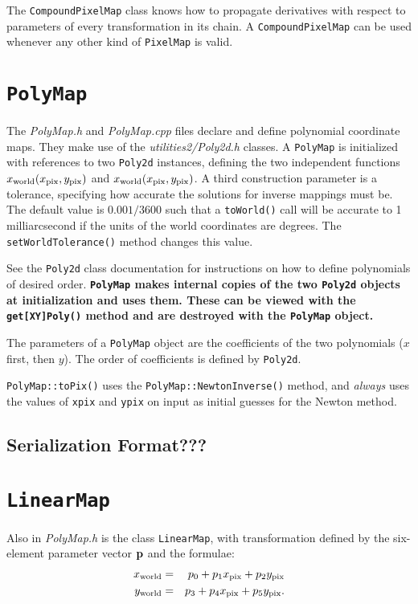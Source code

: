\documentclass[11pt,preprint,flushrt]{aastex}
\begin{document}
The {\tt CompoundPixelMap} class knows how to propagate derivatives with respect to parameters of every transformation in its chain.  A {\tt CompoundPixelMap} can be used whenever any other kind of {\tt PixelMap} is valid.

\section{{\tt PolyMap}}
The {\it PolyMap.h} and {\it PolyMap.cpp} files declare and define polynomial coordinate maps.  They make use of the {\it utilities2/Poly2d.h} classes.  A {\tt PolyMap} is initialized with references to two {\tt Poly2d} instances, defining the two independent functions $x_{\rm world}(x_{\rm pix},y_{\rm pix})$  and $x_{\rm world}(x_{\rm pix},y_{\rm pix})$.  A third construction parameter is a tolerance, specifying how accurate the solutions for inverse mappings must be.  The default value is $0.001/3600$ such that a {\tt toWorld()} call will be accurate to 1 milliarcsecond if the units of the world coordinates are degrees.  The {\tt setWorldTolerance()} method changes this value.

See the {\tt Poly2d} class documentation for instructions on how to define polynomials of desired order.  {\bf {\tt PolyMap} makes internal copies of the two {\tt Poly2d} objects at initialization and uses them.  These can be viewed with the {\tt get[XY]Poly()} method and are destroyed with the {\tt PolyMap} object.}  

The parameters of a {\tt PolyMap} object are the coefficients of the two polynomials ($x$ first, then $y$).  The order of coefficients is defined by {\tt Poly2d}.

{\tt PolyMap::toPix()} uses the {\tt PolyMap::NewtonInverse()} method, and {\em always} uses the values of {\tt xpix} and {\tt ypix} on input as initial guesses for the Newton method.

\subsection{Serialization Format???}

\section{{\tt LinearMap}}
Also in {\it PolyMap.h} is the class {\tt LinearMap}, with transformation defined by the six-element parameter vector ${\bf p}$ and the formulae:
\begin{eqnarray}
x_{\rm world} & = & p_0 + p_1 x_{\rm pix} + p_2 y_{\rm pix} \\
y_{\rm world} & = & p_3 + p_4 x_{\rm pix} + p_5 y_{\rm pix}.
\end{eqnarray}
\end{document}
